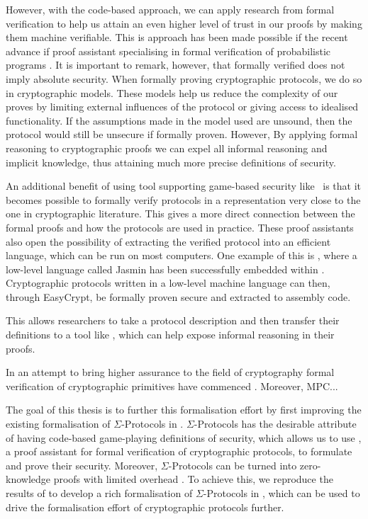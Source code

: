 However, with the code-based approach, we can apply research from
formal verification to help us attain an even higher level of trust in our
proofs by making them machine verifiable.
This is approach has been made possible if the recent advance if proof assistant
specialising in formal verification of probabilistic programs \cite{SOK:CAC}.
It is important to remark, however, that formally verified does not imply
absolute security. When formally proving cryptographic protocols, we do so in
cryptographic models. These models help us reduce the complexity of our proves
by limiting external influences of the protocol or giving access to idealised
functionality. If the assumptions made in the model used are unsound, then the
protocol would still be unsecure if formally proven. However, By applying formal
reasoning to cryptographic proofs we can expel all informal reasoning and
implicit knowledge, thus attaining much more precise definitions of security.

An additional benefit of using tool supporting game-based security like \easycrypt\ is that
it becomes possible to formally verify protocols in a representation very close
to the one in cryptographic literature. This gives a more direct connection between
the formal proofs and how the protocols are used in practice.
These proof assistants also open the possibility of extracting the verified
protocol into an efficient language, which can be run on most computers.
One example of this is \easycrypt, where a low-level language called Jasmin has
been successfully embedded within \cite{easycrypt-jasmin}.
Cryptographic protocols written in a low-level machine language can
then, through EasyCrypt, be formally proven secure and extracted to assembly code.

This allows researchers to take a protocol description and then transfer their
definitions to a tool like \easycrypt, which can help expose informal reasoning
in their proofs.


In an attempt to bring higher assurance to the field of cryptography formal
verification of cryptographic primitives have commenced
\cite{SOK:CAC,ec_intro,cryptoeprint:2019:1185,certicrypt_sigma}.
Moreover, MPC...

The goal of this thesis is to further this formalisation effort by first improving the
existing formalisation of $\Sigma$-Protocols in \easycrypt.
$\Sigma$-Protocols has the desirable attribute of having code-based
game-playing definitions of security, which allows us to use \easycrypt, a
proof assistant for formal verification of cryptographic protocols, to formulate
and prove their security. Moreover, $\Sigma$-Protocols can be turned into
zero-knowledge proofs with limited overhead \cite{zkboo}.
To achieve this, we reproduce the results of \citet{cryptoeprint:2019:1185} to
develop a rich formalisation of $\Sigma$-Protocols in \easycrypt, which can be
used to drive the formalisation effort of cryptographic protocols further.

